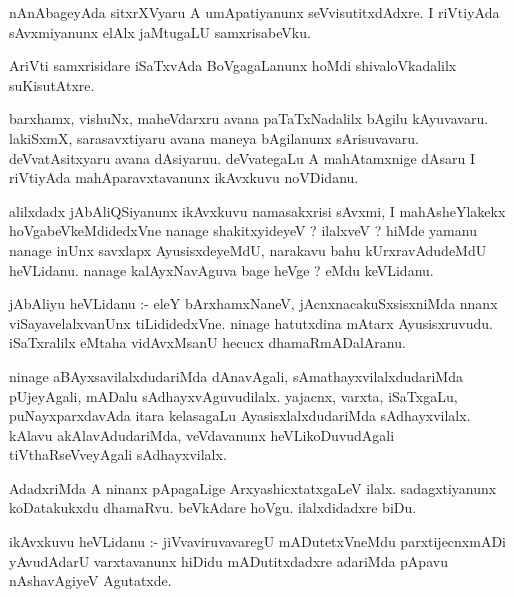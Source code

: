 \documentclass{article}
\begin{document}
\begin{mn}
nAnAbageyAda  sitxrXVyaru  A  umApatiyanunx  seVvisutitxdAdxre.  I  riVtiyAda  sAvxmiyanunx  
elAlx  jaMtugaLU  samxrisabeVku.
\end{mn}

\begin{mn}
AriVti  samxrisidare  iSaTxvAda  BoVgagaLanunx  hoMdi  shivaloVkadalilx  suKisutAtxre.
\end{mn}

\begin{mn}
barxhamx,  vishuNx,  maheVdarxru  avana  paTaTxNadalilx  bAgilu  kAyuvavaru.  lakiSxmX,  sarasavxtiyaru  
avana  maneya  bAgilanunx  sArisuvavaru.  deVvatAsitxyaru  avana  dAsiyaruu.  deVvategaLu  A  mahAtamxnige  
dAsaru  I  riVtiyAda  mahAparavxtavanunx  ikAvxkuvu  noVDidanu.
\end{mn}

\begin{mn}
alilxdadx  jAbAliQSiyanunx  ikAvxkuvu  namasakxrisi  sAvxmi,  I  mahAsheYlakekx  hoVgabeVkeMdidedxVne  
nanage  shakitxyideyeV ?  ilalxveV ?  hiMde  yamanu  nanage  inUnx  savxlapx  AyusisxdeyeMdU,  narakavu  
bahu  kUrxravAdudeMdU  heVLidanu.  nanage  kalAyxNavAguva  bage  heVge ?  eMdu  keVLidanu.
\end{mn}

\begin{mn}
jAbAliyu  heVLidanu :- eleY  bArxhamxNaneV,  jAcnxnacakuSxsisxniMda  nnanx  viSayavelalxvanUnx  
tiLididedxVne.  ninage  hatutxdina  mAtarx  Ayusisxruvudu.  iSaTxralilx  eMtaha  vidAvxMsanU  
hecucx  dhamaRmADalAranu.
\end{mn}

\begin{mn}
ninage  aBAyxsavilalxdudariMda  dAnavAgali,  sAmathayxvilalxdudariMda  pUjeyAgali,  mADalu  sAdhayxvAguvudilalx.  
yajacnx,  varxta,  iSaTxgaLu,  puNayxparxdavAda  itara  kelasagaLu  AyasisxlalxdudariMda  sAdhayxvilalx.  kAlavu  
akAlavAdudariMda,  veVdavanunx  heVLikoDuvudAgali  tiVthaRseVveyAgali  sAdhayxvilalx.
\end{mn}

\begin{mn}
AdadxriMda  A  ninanx  pApagaLige  ArxyashicxtatxgaLeV  ilalx.  sadagxtiyanunx  koDatakukxdu  
dhamaRvu.  beVkAdare  hoVgu.  ilalxdidadxre  biDu.
\end{mn}

\begin{mn}
ikAvxkuvu  heVLidanu :- jiVvaviruvavaregU  mADutetxVneMdu  parxtijecnxmADi  yAvudAdarU  varxtavanunx  
hiDidu  mADutitxdadxre  adariMda  pApavu  nAshavAgiyeV  Agutatxde.
\end{mn}
\end{document}
